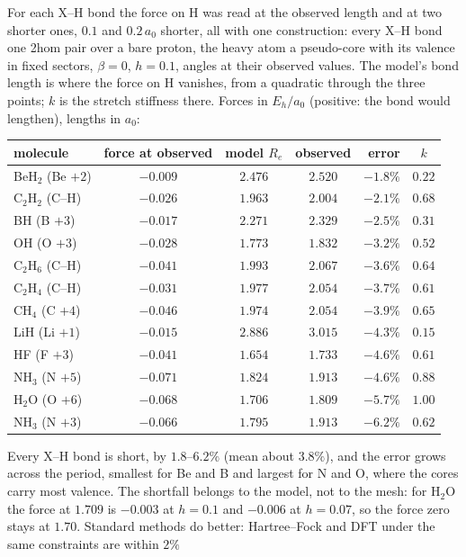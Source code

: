 \documentclass[11pt]{article}
\begin{document}
For each X--H bond the force on H was read at the observed length and at two shorter ones, $0.1$ and $0.2\,a_0$
shorter, all with one construction: every X--H bond one 2hom pair over a bare proton, the heavy atom a pseudo-core
with its valence in fixed sectors, $\beta = 0$, $h = 0.1$, angles at their observed values. The model's bond length
is where the force on H vanishes, from a quadratic through the three points; $k$ is the stretch stiffness there.
Forces in $E_h/a_0$ (positive: the bond would lengthen), lengths in $a_0$:
\begin{center}
\small
\begin{tabular}{lcccrc}
\toprule
molecule & force at observed & model $R_e$ & observed & error & $k$ \\
\midrule
BeH$_2$ (Be $+2$) & $-0.009$ & $2.476$ & $2.520$ & $-1.8\%$ & $0.22$ \\
C$_2$H$_2$ (C--H) & $-0.026$ & $1.963$ & $2.004$ & $-2.1\%$ & $0.68$ \\
BH (B $+3$) & $-0.017$ & $2.271$ & $2.329$ & $-2.5\%$ & $0.31$ \\
OH (O $+3$) & $-0.028$ & $1.773$ & $1.832$ & $-3.2\%$ & $0.52$ \\
C$_2$H$_6$ (C--H) & $-0.041$ & $1.993$ & $2.067$ & $-3.6\%$ & $0.64$ \\
C$_2$H$_4$ (C--H) & $-0.031$ & $1.977$ & $2.054$ & $-3.7\%$ & $0.61$ \\
CH$_4$ (C $+4$) & $-0.046$ & $1.974$ & $2.054$ & $-3.9\%$ & $0.65$ \\
LiH (Li $+1$) & $-0.015$ & $2.886$ & $3.015$ & $-4.3\%$ & $0.15$ \\
HF (F $+3$) & $-0.041$ & $1.654$ & $1.733$ & $-4.6\%$ & $0.61$ \\
NH$_3$ (N $+5$) & $-0.071$ & $1.824$ & $1.913$ & $-4.6\%$ & $0.88$ \\
H$_2$O (O $+6$) & $-0.068$ & $1.706$ & $1.809$ & $-5.7\%$ & $1.00$ \\
NH$_3$ (N $+3$) & $-0.066$ & $1.795$ & $1.913$ & $-6.2\%$ & $0.62$ \\
\bottomrule
\end{tabular}
\end{center}
Every X--H bond is short, by $1.8$--$6.2\%$ (mean about $3.8\%$), and the error grows across the period, smallest
for Be and B and largest for N and O, where the cores carry most valence. The shortfall belongs to the model,
not to the mesh: for H$_2$O the force at $1.709$ is $-0.003$ at $h = 0.1$ and $-0.006$ at $h = 0.07$, so the force
zero stays at $1.70$. Standard methods do better: Hartree--Fock and DFT under the same constraints are within $2\%$
\end{document}
